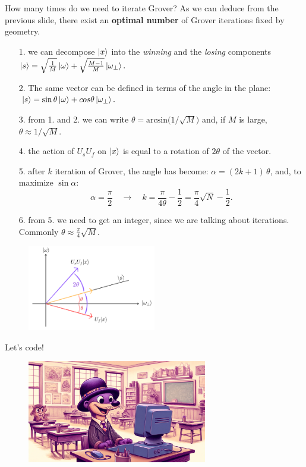 \documentclass[aspectratio=169, 8pt, xcolor={svgnames}, hyperref={linkcolor=black}]{beamer}
\begin{document}
\begin{frame}{How many times do we need to iterate Grover?}
As we can deduce from the previous slide, there exist an \textbf{optimal number} of Grover iterations fixed by geometry.

\begin{itemize}
\item[1.] we can decompose $\ket{x}$ into the \textit{winning} and the \textit{losing} 
components $\ket{s} = \sqrt{\frac{1}{M}} \ket{\omega} + \sqrt{\frac{M-1}{M}} \ket{\omega_{\bot}}.$
\item[2.]  The same vector can be
defined in terms of the angle in the plane: $\,\ket{s} = \sin \theta \ket{\omega} + cos \theta \ket{\omega_{\bot}}.$
\end{itemize}
\begin{multicols}{2}
\begin{itemize}
\item[3.] from 1. and 2. we can write $\theta = \text{arcsin}\bigl(1/\sqrt{M}\bigr)$ and, if $M$ is large,
$\theta \approx 1/\sqrt{M}. $
\item[4.] the action of $U_s U_f$ on $\ket{x}$ is equal to a rotation of $2\theta$ of the vector.
\item[5.] after $k$ iteration of Grover, the angle has become: $\alpha = (2k + 1)\,\theta$, and, to maximize $\sin \alpha$:
$$ \alpha = \frac{\pi}{2} \quad \to \quad k = \frac{\pi}{4\theta} - \frac{1}{2} = \frac{\pi}{4} \sqrt{N} - \frac{1}{2}. $$
\item[6.] from 5. we need to get an integer, since we are talking about iterations. 
Commonly $\theta \approx \frac{\pi}{4} \sqrt{M}.$ 
\end{itemize}
\begin{figure}
   \includegraphics[width=0.5\textwidth]{figures/thetas.png}
\end{figure}
\end{multicols}
\end{frame}

\begin{frame}
\centering
\Huge Let's code!
\begin{figure}
   \includegraphics[width=0.7\textwidth]{figures/hands_on.png}
\end{figure}
\end{frame}
\end{document}
